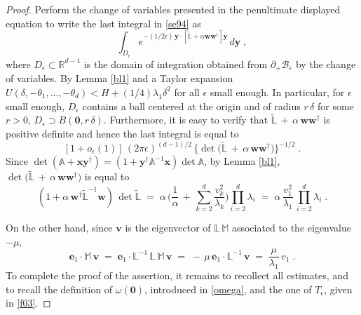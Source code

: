 \documentclass[reqno]{amsart}
\newcounter{as}[section]
\newcommand{\mc}[1]{{\mathcal #1}}
\newcommand{\bb}[1]{{\mathbb #1}}
\newcommand{\bs}[1]{{\boldsymbol #1}}
\newcommand{\<}{\langle}
\renewcommand{\>}{\rangle}
\begin{document}
\begin{proof}
Perform the change of variables presented in the penultimate displayed
equation to write the last integral in \eqref{se94} as
\begin{equation*}
\int_{D_\epsilon} e^{- (1/2\epsilon) \, \bs{y}\cdot [
  \widetilde{\bb{L}} + \alpha \bs{w} \bs {w}^{\dagger} ] \bs{y} }
\, d\bs{y}\;,
\end{equation*}
where $D_\epsilon\subset \bb R^{d-1}$ is the domain of integration
obtained from $\partial_{+}\mc{B}_{\epsilon}$ by the change of
variables. By Lemma \ref{bl1} and a Taylor expansion $U(\delta,
-  \theta_1, \dots, -  \theta_d) < H + (1/4) \lambda_1
\delta^2$ for all $\epsilon$ small enough. In particular, for
$\epsilon$ small enough, $D_\epsilon$ contains a ball centered at the
origin and of radius $r\, \delta$ for some $r>0$, $D_\epsilon \supset
B(\bs 0, r\, \delta)$. Furthermore, it is easy to verify that
$\widetilde{\bb{L}} \,+\, \alpha\, {\bs w} {\bs w}^{\dagger}$ is
positive definite and hence the last integral is equal to
\begin{equation*}
\left[1+o_{\epsilon}(1)\right] \, (2\pi\epsilon)^{(d-1)/2}
\, \Big\{\det \big( \widetilde{\bb{L}} \,+\,
\alpha\, {\bs w} {\bs w}^{\dagger}\big)\Big\}^{-1/2}\;.
\end{equation*}
Since $\det(\bb{A} + \bs{x} \bs {y}^{\dagger}) =
(1+\bs{y}^{\dagger}\bb{A}^{-1}\bs{x})\det\bb{A}$, by Lemma \ref{bl1},
$\det \big( \widetilde{\bb{L}} \,+\, \alpha\, {\bs w} {\bs
  w}^{\dagger}\big)$ is equal to
\begin{equation*}
(1+\alpha\, {{\bs w}}^{\dagger} \widetilde{\bb{L}}^{-1} \bs{w}) \,
\det{\widetilde{\bb L}}\;=\;\alpha \, \Big( \frac{1}{\alpha}
\,+\, \sum_{k=2}^{d}\frac{v_{k}^{2}}{\lambda_{k}}\Big)
\prod_{i=2}^{d}\lambda_{i}\;=\;
\alpha\, \frac{v_{1}^{2}}{\lambda_{1}}\, \prod_{i=2}^{d}\lambda_{i}\;.
\end{equation*}

On the other hand, since $\bs v$ is the eigenvector of $\bb{L}\,
\bb{M}$ associated to the eigenvalue $-\mu$,
\begin{equation*}
\bs{e}_{1}\cdot\bb{M}\, \bs{v}\;=\;
\bs{e}_{1}\cdot\bb{L}^{-1}\, \bb{L}\, \bb{M}\, \bs{v}
\;=\; -\, \mu\, \bs{e}_{1} \cdot \bb{L}^{-1}\, \bs{v}
\;=\;\frac{\mu}{\lambda_{1}}\, v_{1}\;.
\end{equation*}
To complete the proof of the assertion, it remains to recollect all
estimates, and to recall the definition of $\omega(\bs 0)$, introduced
in \eqref{omega}, and the one of $T_{\epsilon}$, given in \eqref{f03}.
\end{proof}
\end{document}
